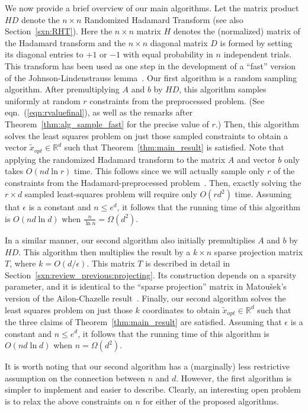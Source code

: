 \documentclass[11pt]{article}
\begin{document}
We now provide a brief overview of our main algorithms. Let the matrix product $HD$ denote the $n \times n$ Randomized Hadamard Transform (see also Section~\ref{sxn:RHT}). Here the $n \times n$ matrix $H$ denotes the (normalized) matrix of the Hadamard transform and the $n \times n$ diagonal matrix $D$ is formed by setting its diagonal entries to $+1$ or $-1$ with equal probability in $n$  independent trials. This transform has been used as one step in the development of a ``fast'' version of the Johnson-Lindenstrauss lemma~\cite{AC06,Matousek08_RSA}. Our first algorithm is a random sampling algorithm. After premultiplying $A$ and $b$ by $HD$, this algorithm samples uniformly at random $r$ constraints from the preprocessed problem. (See eqn.~(\ref{eqn:rvaluefinal}), as well as the remarks after Theorem~\ref{thm:alg_sample_fast} for the precise value of $r$.) Then, this algorithm solves the least squares problem on just those sampled constraints to obtain a vector $\tilde{x}_{opt} \in \mathbb{R}^d$ such that Theorem~\ref{thm:main_result} is satisfied. Note that applying the randomized Hadamard transform to the matrix $A$ and vector $b$ only takes $O(n d \ln r)$ time. This follows since we will actually sample only $r$ of the constraints from the Hadamard-preprocessed problem~\cite{AL08}. Then, exactly solving the $r \times d$ sampled least-squares problem will require only $O(rd^2)$ time. Assuming that $\epsilon$ is a constant and $n \leq e^d$, it follows that the running time of this algorithm is $O(nd\ln d)$ when $\frac{n}{\ln n} = \Omega(d^2)$.

In a similar manner, our second algorithm also initially premultiplies $A$ and $b$ by $HD$. This algorithm then multiplies the result by a $k \times n$ sparse projection matrix $T$, where $k=O(d/\epsilon)$. This matrix $T$ is described in detail in Section~\ref{sxn:review_previous:projecting}. Its construction depends on a sparsity parameter, and it is identical to the ``sparse
projection'' matrix in Matou\v{s}ek's version of the Ailon-Chazelle result~\cite{AC06,Matousek08_RSA}. Finally, our second algorithm solves the least squares problem on just those $k$ coordinates to
obtain $\tilde{x}_{opt} \in \mathbb{R}^d$ such that the three claims of Theorem~\ref{thm:main_result} are satisfied. Assuming that $\epsilon$ is a constant and $n \leq e^d$, it follows that the running time of this algorithm is $O(nd\ln d)$ when $n = \Omega(d^2)$.

It is worth noting that our second algorithm has a (marginally) less restrictive assumption on the connection between $n$ and $d$. However, the first algorithm is simpler to implement and easier to describe. Clearly, an interesting open problem is to relax the above constraints on $n$ for either of the proposed algorithms.
\end{document}
